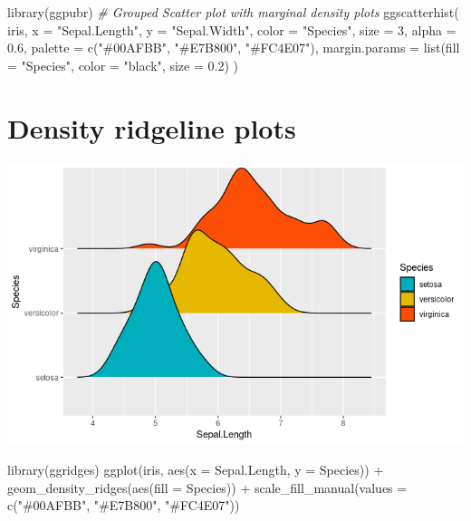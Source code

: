 \documentclass[
]{book}
\newenvironment{Shaded}{\begin{snugshade}}{\end{snugshade}}
\newcommand{\AttributeTok}[1]{\textcolor[rgb]{0.77,0.63,0.00}{#1}}
\newcommand{\CommentTok}[1]{\textcolor[rgb]{0.56,0.35,0.01}{\textit{#1}}}
\newcommand{\DecValTok}[1]{\textcolor[rgb]{0.00,0.00,0.81}{#1}}
\newcommand{\FloatTok}[1]{\textcolor[rgb]{0.00,0.00,0.81}{#1}}
\newcommand{\FunctionTok}[1]{\textcolor[rgb]{0.00,0.00,0.00}{#1}}
\newcommand{\NormalTok}[1]{#1}
\newcommand{\SpecialCharTok}[1]{\textcolor[rgb]{0.00,0.00,0.00}{#1}}
\newcommand{\StringTok}[1]{\textcolor[rgb]{0.31,0.60,0.02}{#1}}
\begin{document}
\begin{Shaded}
\begin{Highlighting}[]
\FunctionTok{library}\NormalTok{(ggpubr)}
\CommentTok{\# Grouped Scatter plot with marginal density plots}
\FunctionTok{ggscatterhist}\NormalTok{(}
\NormalTok{  iris, }
  \AttributeTok{x =} \StringTok{"Sepal.Length"}\NormalTok{, }
  \AttributeTok{y =} \StringTok{"Sepal.Width"}\NormalTok{,}
  \AttributeTok{color =} \StringTok{"Species"}\NormalTok{, }
  \AttributeTok{size =} \DecValTok{3}\NormalTok{, }
  \AttributeTok{alpha =} \FloatTok{0.6}\NormalTok{,}
  \AttributeTok{palette =} \FunctionTok{c}\NormalTok{(}\StringTok{"\#00AFBB"}\NormalTok{, }\StringTok{"\#E7B800"}\NormalTok{, }\StringTok{"\#FC4E07"}\NormalTok{),}
  \AttributeTok{margin.params =} \FunctionTok{list}\NormalTok{(}\AttributeTok{fill =} \StringTok{"Species"}\NormalTok{, }\AttributeTok{color =} \StringTok{"black"}\NormalTok{, }\AttributeTok{size =} \FloatTok{0.2}\NormalTok{)}
\NormalTok{  )}
\end{Highlighting}
\end{Shaded}

\hypertarget{density-ridgeline-plots}{%
\section{Density ridgeline plots}\label{density-ridgeline-plots}}

\includegraphics{images/10/000004.png}

\begin{Shaded}
\begin{Highlighting}[]
\FunctionTok{library}\NormalTok{(ggridges)}
\FunctionTok{ggplot}\NormalTok{(iris, }\FunctionTok{aes}\NormalTok{(}\AttributeTok{x =}\NormalTok{ Sepal.Length, }\AttributeTok{y =}\NormalTok{ Species)) }\SpecialCharTok{+}
  \FunctionTok{geom\_density\_ridges}\NormalTok{(}\FunctionTok{aes}\NormalTok{(}\AttributeTok{fill =}\NormalTok{ Species)) }\SpecialCharTok{+}
  \FunctionTok{scale\_fill\_manual}\NormalTok{(}\AttributeTok{values =} \FunctionTok{c}\NormalTok{(}\StringTok{"\#00AFBB"}\NormalTok{, }\StringTok{"\#E7B800"}\NormalTok{, }\StringTok{"\#FC4E07"}\NormalTok{))}
\end{Highlighting}
\end{Shaded}
\end{document}

